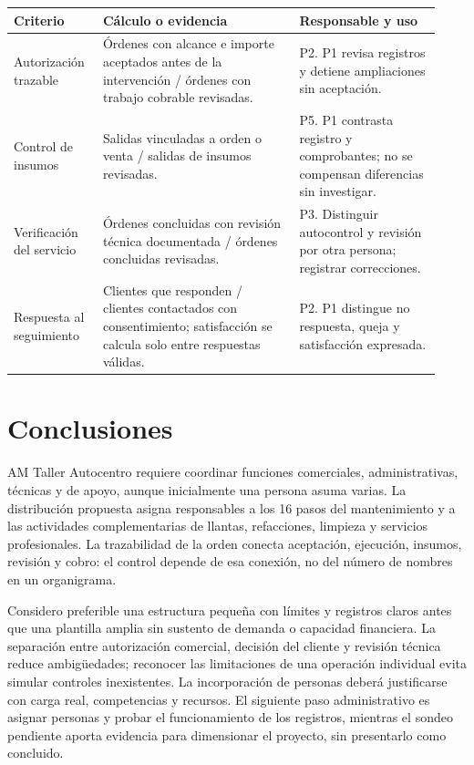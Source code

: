 {{\small\renewcommand{\arraystretch}{1.15}\begin{longtable}{@{}p{0.19\linewidth}p{0.43\linewidth}p{0.31\linewidth}@{}}
\toprule \textbf{Criterio} & \textbf{Cálculo o evidencia} & \textbf{Responsable y uso} \\ \midrule\endhead
Autorización trazable & Órdenes con alcance e importe aceptados antes de la intervención / órdenes con trabajo cobrable revisadas. & P2. P1 revisa registros y detiene ampliaciones sin aceptación. \\ \midrule
Control de insumos & Salidas vinculadas a orden o venta / salidas de insumos revisadas. & P5. P1 contrasta registro y comprobantes; no se compensan diferencias sin investigar. \\ \midrule
Verificación del servicio & Órdenes concluidas con revisión técnica documentada / órdenes concluidas revisadas. & P3. Distinguir autocontrol y revisión por otra persona; registrar correcciones. \\ \midrule
Respuesta al seguimiento & Clientes que responden / clientes contactados con consentimiento; satisfacción se calcula solo entre respuestas válidas. & P2. P1 distingue no respuesta, queja y satisfacción expresada. \\ \midrule
\end{longtable}}
\clearpage\section{Conclusiones}
AM Taller Autocentro requiere coordinar funciones comerciales, administrativas, técnicas y de apoyo, aunque inicialmente una persona asuma varias. La distribución propuesta asigna responsables a los 16 pasos del mantenimiento y a las actividades complementarias de llantas, refacciones, limpieza y servicios profesionales. La trazabilidad de la orden conecta aceptación, ejecución, insumos, revisión y cobro: el control depende de esa conexión, no del número de nombres en un organigrama.


Considero preferible una estructura pequeña con límites y registros claros antes que una plantilla amplia sin sustento de demanda o capacidad financiera. La separación entre autorización comercial, decisión del cliente y revisión técnica reduce ambigüedades; reconocer las limitaciones de una operación individual evita simular controles inexistentes. La incorporación de personas deberá justificarse con carga real, competencias y recursos. El siguiente paso administrativo es asignar personas y probar el funcionamiento de los registros, mientras el sondeo pendiente aporta evidencia para dimensionar el proyecto, sin presentarlo como concluido.


}
